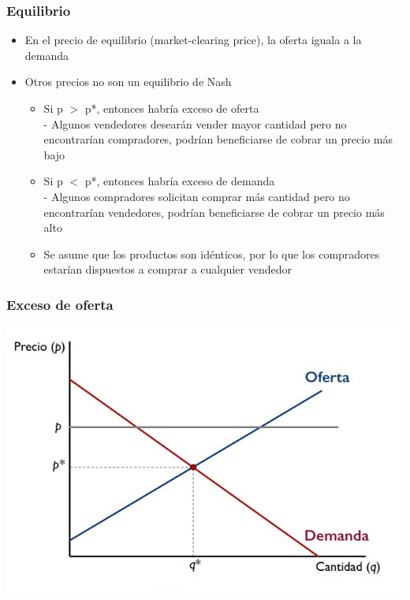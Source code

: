 \documentclass{beamer}
\begin{document}
\begin{frame}
\frametitle{ Equilibrio}
\begin{itemize}
    \item En el precio de equilibrio (market-clearing price), la oferta iguala a la demanda
    \item Otros precios no son un equilibrio de Nash
    \begin{itemize}
        \item Si p $>$ p*, entonces habría exceso de oferta \\
        - Algunos vendedores desearán vender mayor cantidad pero no encontrarían compradores, podrían beneficiarse de cobrar un precio más bajo
        \item Si p $<$ p*, entonces habría exceso de demanda \\
        - Algunos compradores solicitan comprar más cantidad pero no encontrarían vendedores, podrían beneficiarse de cobrar un precio más alto
        \item Se asume que los productos son idénticos, por lo que los compradores estarían dispuestos a comprar a cualquier vendedor
    \end{itemize}
\end{itemize}
\end{frame}

\begin{frame}
\frametitle{ Exceso de oferta}
\includegraphics[scale=0.6]{Figures/Tema_07.3_equilibrioofertademanda_0excesodeoferta.jpg}
\end{frame}
\end{document}
